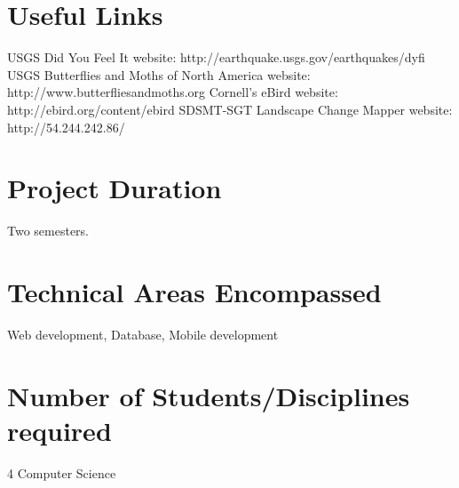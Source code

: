 \section{Useful Links}
USGS Did You Feel It website: http://earthquake.usgs.gov/earthquakes/dyfi
USGS Butterflies and Moths of North America website:  http://www.butterfliesandmoths.org
Cornell’s eBird website: http://ebird.org/content/ebird
SDSMT-SGT Landscape Change Mapper website: http://54.244.242.86/

\section{Project Duration}  Two semesters.

\section{Technical Areas Encompassed} 
Web development, Database, Mobile development

\section{Number of Students/Disciplines required} 4 Computer Science


